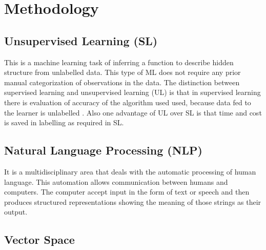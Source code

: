 \chapter{Methodology}
\section{Unsupervised Learning (SL)}
This is a machine learning task of inferring a function to describe hidden structure from unlabelled data. This type of ML does not require any prior manual categorization of observations in the data. The distinction between supervised learning and unsupervised learning (UL) is that in supervised learning there is evaluation of accuracy of the algorithm used used, because data fed to the learner is unlabelled . Also one advantage of UL over SL is that time and cost is saved in labelling as required in SL. 
\section{Natural Language Processing (NLP)}
It is a multidisciplinary area that deals with the automatic processing of human language. 
This automation allows communication between humans and computers. The computer accept input in the form of text or speech and then produces structured representations showing the meaning of those strings as their output.
\section{Vector Space}

